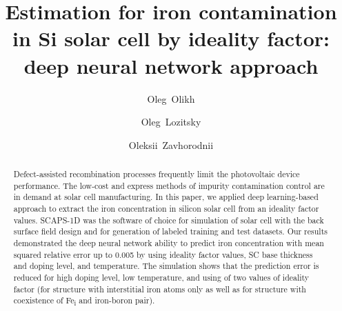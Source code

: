 \documentclass[a4paper,fleqn]{cas-sc}
\begin{document}
\def\floatpagepagefraction{1}
\def\textpagefraction{.001}

\title [mode = title]{Estimation for iron contamination in Si solar cell by ideality factor: deep neural network approach}


\author[1]{Oleg~Olikh}
\cormark[1]


\address[1]{Taras Shevchenko National University of Kyiv, 64/13, Volodymyrska Street, City of Kyiv, Ukraine, 01601}

\author[1]{Oleg~Lozitsky}


\author[1]{Oleksii~Zavhorodnii}




\begin{abstract}
Defect-assisted recombination processes frequently
limit the photovoltaic device performance.
The low-cost and express methods of impurity contamination control
are in demand at solar cell manufacturing.
In this paper, we applied deep learning-based
approach to extract the iron concentration in silicon solar cell from an
ideality factor values.
SCAPS-1D was the software of choice for simulation of solar cell with the back surface field design
and for generation of labeled training and test datasets.
Our results demonstrated the deep neural network ability
to predict iron concentration with mean squared relative error up to 0.005 by using ideality factor values, SC base thickness and doping level, and temperature.
The simulation shows that the prediction error
is reduced for high doping level, low temperature, and using of two values of ideality factor (for structure with interstitial iron atoms only as well as for structure with
coexistence of Fe\textsubscript{i} and iron-boron pair).

\end{abstract}

\end{document}
